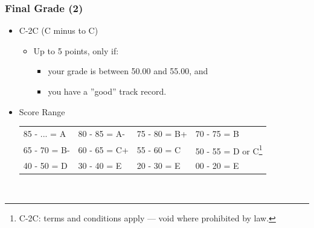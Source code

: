 \documentclass[aspectratio=169, xcolor=table, notheorems, hyperref={pdfpagelabels=false}]{beamer}
\begin{document}
\begin{frame}
\frametitle{Final Grade (2)}

\begin{itemize}

\item C-2C (C minus to C)
\begin{itemize}
\item Up to 5 points, only if:
\begin{itemize}
\item your grade is between 50.00 and 55.00, and
\item you have a ''good'' track record.
\end{itemize}
\end{itemize}

\item Score Range\\[10pt]
\begin{tabular}{l l l l}
\hline
85 - ... = A & 80 - 85 = A- & 75 - 80 = B+ & 70 - 75 = B \\
65 - 70 = B-      & 60 - 65 = C+ & 55 - 60 = C  & 
50 - 55 = D or C\footnote{C-2C: terms and conditions apply --- void where prohibited by law.}  \\
40 - 50 = D  & 30 - 40 = E  & 20 - 30 = \small E & 00 - 20 = \tiny E   \\
\hline \end{tabular}\\[10pt]

\end{itemize}

\end{frame}
\end{document}
